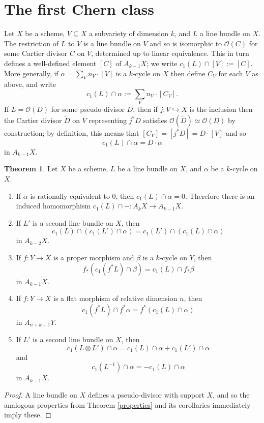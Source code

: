 \documentclass[12pt]{article}
\theoremstyle{definition}
\theoremstyle{theorem}
\newtheorem{thm}[defn]{Theorem}
\renewcommand{\O}{\mathcal O}
\newcommand{\tensor}{\otimes}
\newcommand{\1}{\mathbbm 1}
\newcommand{\inject}{\hookrightarrow}
\begin{document}
\section{The first Chern class}
Let $X$ be a scheme, $V \subseteq X$ a subvariety of dimension $k$, and $L$ a line bundle on $X$. The restriction of $L$ to $V$ is a line bundle on $V$ and so is isomorphic to $\O(C)$ for some Cartier divisor $C$ on $V$, determined up to linear equivalence. This in turn defines a well-defined element $[C]$ of $A_{k-1} X$; we write $c_1(L) \cap [V] := [C]$. More generally, if $\alpha = \sum_V n_V \cdot [V]$ is a $k$-cycle on $X$ then define $C_V$ for each $V$ as above, and write \[ c_1(L) \cap \alpha := \sum_V n_V \cdot [C_V] . \] If $L = \O(D)$ for some pseudo-divisor $D$, then if $j: V \inject X$ is the inclusion then the Cartier divisor $\tilde D$ on $V$ representing $j^* D$ satisfies $\O(\tilde D) \simeq \O(D)$ by construction; by definition, this means that $[C_V] = [j^* D] = D \cdot [V]$ and so \[ c_1(L) \cap \alpha = D \cdot \alpha \] in $A_{k-1} X$.

\begin{thm} \label{Chern properties}
Let $X$ be a scheme, $L$ be a line bundle on $X$, and $\alpha$ be a $k$-cycle on $X$.
\begin{enumerate}[{{\em(\hspace{-1pt}}}a{\em)}]
\item If $\alpha$ is rationally equivalent to $0$, then $c_1(L) \cap \alpha = 0$. Therefore there is an induced homomorphism $c_1(L) \cap - : A_k X \to A_{k-1} X$.
\item If $L'$ is a second line bundle on $X$, then \[ c_1(L) \cap (c_1(L') \cap \alpha) = c_1(L') \cap (c_1(L) \cap \alpha) \] in $A_{k-2}X$.
\item If $f: Y \to X$ is a proper morphism and $\beta$ is a $k$-cycle on $Y$, then \[ f_* (c_1(f^* L) \cap \beta) = c_1(L) \cap f_* \beta \] in $A_{k-1} X$.
\item If $f: Y \to X$ is a flat morphism of relative dimension $n$, then \[ c_1(f^* L) \cap f^* \alpha = f^* (c_1(L) \cap \alpha) \] in $A_{n+k-1} Y$.
\item If $L'$ is a second line bundle on $X$, then \[ c_1(L \tensor L') \cap \alpha = c_1(L) \cap \alpha + c_1(L') \cap \alpha \] and \[ c_1(L^{-1}) \cap \alpha = - c_1(L) \cap \alpha \] in $A_{k-1} X$.
\end{enumerate}
\end{thm}
\begin{proof}
A line bundle on $X$ defines a pseudo-divisor with support $X$, and so the analogous properties from Theorem \ref{properties} and its corollaries immediately imply these.
\end{proof}
\end{document}

